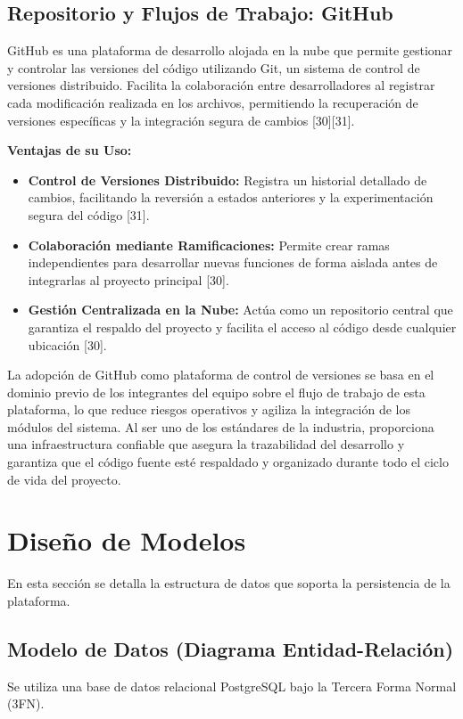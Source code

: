 \subsection{Repositorio y Flujos de Trabajo: GitHub}
GitHub es una plataforma de desarrollo alojada en la nube que permite gestionar y controlar las versiones del código utilizando Git, un sistema de control de versiones distribuido. Facilita la colaboración entre desarrolladores al registrar cada modificación realizada en los archivos, permitiendo la recuperación de versiones específicas y la integración segura de cambios [30][31].

\textbf{Ventajas de su Uso:}
\begin{itemize}
    \item \textbf{Control de Versiones Distribuido:} Registra un historial detallado de cambios, facilitando la reversión a estados anteriores y la experimentación segura del código [31].
    \item \textbf{Colaboración mediante Ramificaciones:} Permite crear ramas independientes para desarrollar nuevas funciones de forma aislada antes de integrarlas al proyecto principal [30].
    \item \textbf{Gestión Centralizada en la Nube:} Actúa como un repositorio central que garantiza el respaldo del proyecto y facilita el acceso al código desde cualquier ubicación [30].
\end{itemize}

La adopción de GitHub como plataforma de control de versiones se basa en el dominio previo de los integrantes del equipo sobre el flujo de trabajo de esta plataforma, lo que reduce riesgos operativos y agiliza la integración de los módulos del sistema. Al ser uno de los estándares de la industria, proporciona una infraestructura confiable que asegura la trazabilidad del desarrollo y garantiza que el código fuente esté respaldado y organizado durante todo el ciclo de vida del proyecto.






\section{Diseño de Modelos}
En esta sección se detalla la estructura de datos que soporta la persistencia de la plataforma.

\subsection{Modelo de Datos (Diagrama Entidad-Relación)}
Se utiliza una base de datos relacional PostgreSQL bajo la Tercera Forma Normal (3FN).

